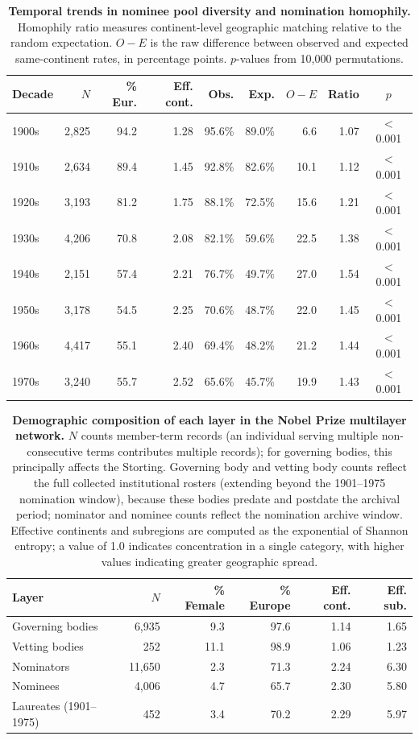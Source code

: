 \documentclass[12pt]{article}
\begin{document}
\begin{table}
\centering
\caption{\textbf{Temporal trends in nominee pool diversity and nomination homophily.} Homophily ratio measures continent-level geographic matching relative to the random expectation. $O - E$ is the raw difference between observed and expected same-continent rates, in percentage points. $p$-values from 10,000 permutations.}
\label{tab:temporal_homophily}
\small
\begin{tabular}{lrrrrrrrc}
\hline
Decade & $N$ & \% Eur. & Eff. cont. & Obs. & Exp. & $O - E$ & Ratio & $p$ \\
\hline
1900s & 2,825 & 94.2 & 1.28 & 95.6\% & 89.0\% & 6.6 & 1.07 & $<$0.001 \\
1910s & 2,634 & 89.4 & 1.45 & 92.8\% & 82.6\% & 10.1 & 1.12 & $<$0.001 \\
1920s & 3,193 & 81.2 & 1.75 & 88.1\% & 72.5\% & 15.6 & 1.21 & $<$0.001 \\
1930s & 4,206 & 70.8 & 2.08 & 82.1\% & 59.6\% & 22.5 & 1.38 & $<$0.001 \\
1940s & 2,151 & 57.4 & 2.21 & 76.7\% & 49.7\% & 27.0 & 1.54 & $<$0.001 \\
1950s & 3,178 & 54.5 & 2.25 & 70.6\% & 48.7\% & 22.0 & 1.45 & $<$0.001 \\
1960s & 4,417 & 55.1 & 2.40 & 69.4\% & 48.2\% & 21.2 & 1.44 & $<$0.001 \\
1970s & 3,240 & 55.7 & 2.52 & 65.6\% & 45.7\% & 19.9 & 1.43 & $<$0.001 \\
\hline
\end{tabular}
\end{table}

\begin{table}
\centering
\caption{\textbf{Demographic composition of each layer in the Nobel Prize multilayer network.} $N$ counts member-term records (an individual serving multiple non-consecutive terms contributes multiple records); for governing bodies, this principally affects the Storting. Governing body and vetting body counts reflect the full collected institutional rosters (extending beyond the 1901--1975 nomination window), because these bodies predate and postdate the archival period; nominator and nominee counts reflect the nomination archive window. Effective continents and subregions are computed as the exponential of Shannon entropy; a value of 1.0 indicates concentration in a single category, with higher values indicating greater geographic spread.}
\label{tab:layer_composition}
\small
\begin{tabular}{lrrrrr}
\hline
Layer & $N$ & \% Female & \% Europe & Eff. cont. & Eff. sub. \\
\hline
Governing bodies & 6,935 & 9.3 & 97.6 & 1.14 & 1.65 \\
Vetting bodies & 252 & 11.1 & 98.9 & 1.06 & 1.23 \\
Nominators & 11,650 & 2.3 & 71.3 & 2.24 & 6.30 \\
Nominees & 4,006 & 4.7 & 65.7 & 2.30 & 5.80 \\
Laureates (1901--1975) & 452 & 3.4 & 70.2 & 2.29 & 5.97 \\
\hline
\end{tabular}
\end{table}



\end{document}
